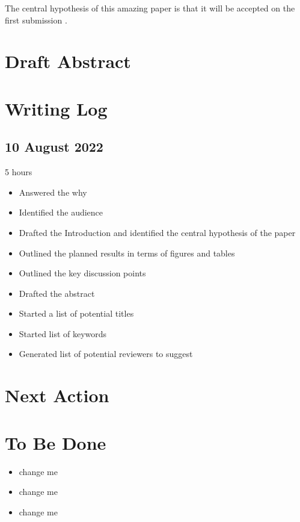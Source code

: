 \documentclass[10pt,letterpaper]{article}
\begin{document}
\begin{itemize}
\begin{itemize}
The central hypothesis of this amazing paper is that it will be accepted on the first submission \cite{chaloner1995bayesianexperimentaldesignareview}.


\section{Draft Abstract}



\section{Writing Log}

\subsection{10 August 2022}
5 hours

\begin{itemize}
  \item Answered the why
  \item Identified the audience
  \item Drafted the Introduction and identified the central hypothesis of the paper
  \item Outlined the planned results in terms of figures and tables
  \item Outlined the key discussion points
  \item Drafted the abstract
  \item Started a list of potential titles
  \item Started list of keywords
  \item Generated list of potential reviewers to suggest  
\end{itemize}


\section{Next Action}


\section{To Be Done}

\begin{itemize}
  \item change me
  \item change me
  \item change me
\end{itemize}




\end{itemize}
\end{itemize}
\end{document}
